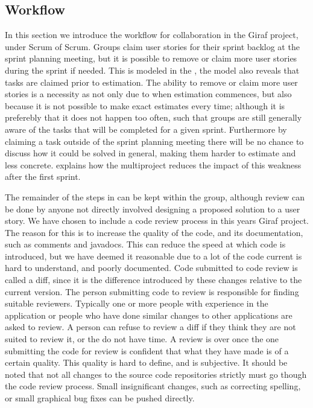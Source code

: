 \subsection*{Workflow}
In this section we introduce the workflow for collaboration in the Giraf project, under Scrum of Scrum. 
Groups claim user stories for their sprint backlog at the sprint planning meeting, but it is possible to remove or claim more user stories during the sprint if needed. 
This is modeled in the , the model also reveals that tasks are claimed prior to estimation.
The ability to remove or claim more user stories is a necessity as not only due to when estimation commences, but also because it is not possible to make exact estimates every time; although it is preferebly that it does not happen too often, such that groups are still generally aware of the tasks that will be completed for a given sprint.
Furthermore by claiming a task outside of the sprint planning meeting there will be no chance to discuss how it could be solved in general, making them harder to estimate and less concrete.
 explains how the multiproject reduces the impact of this weakness after the first sprint.

\bigskip 
\noindent
The remainder of the steps in  can be kept within the group, although review can be done by anyone not directly involved designing a proposed solution to a user story.
We have chosen to include a code review process in this years Giraf project. 
The reason for this is to increase the quality of the code, and its documentation, such as comments and javadocs. 
This can reduce the speed at which code is introduced, but we have deemed it reasonable due to a lot of the code current is hard to understand, and poorly documented. 
Code submitted to code review is called a diff, since it is the difference introduced by these changes relative to the current version. 
The person submitting code to review is responsible for finding suitable reviewers.
Typically one or more people with experience in the application or people who have done similar changes to other applications are asked to review.
A person can refuse to review a diff if they think they are not suited to review it, or the do not have time. 
A review is over once the one submitting the code for review is confident that what they have made is of a certain quality.
This quality is hard to define, and is subjective.
It should be noted that not all changes to the source code repositories strictly must go though the code review process.
Small insignificant changes, such as correcting spelling, or small graphical bug fixes can be pushed directly. 

